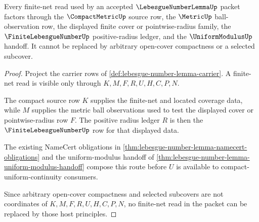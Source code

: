 \begin{theorem}
\label{thm:lebesgue-number-lemma-finite-net-route}
Every finite-net read used by an accepted $\LebesgueNumberLemmaUp$ packet factors through the $\CompactMetricUp$ source row, the $\MetricUp$ ball-observation row, the displayed finite cover or pointwise-radius family, the $\FiniteLebesgueNumberUp$ positive-radius ledger, and the $\UniformModulusUp$ handoff. It cannot be replaced by arbitrary open-cover compactness or a selected subcover.
\end{theorem}
\begin{proof}
Project the carrier rows of \autoref{def:lebesgue-number-lemma-carrier}. A finite-net read is visible only through $K,M,F,R,U,H,C,P,N$.

The compact source row $K$ supplies the finite-net and located coverage data, while $M$ supplies the metric ball observations used to test the displayed cover or pointwise-radius row $F$. The positive radius ledger $R$ is then the $\FiniteLebesgueNumberUp$ row for that displayed data.

The existing NameCert obligations in \autoref{thm:lebesgue-number-lemma-namecert-obligations} and the uniform-modulus handoff of \autoref{thm:lebesgue-number-lemma-uniform-modulus-handoff} compose this route before $U$ is available to compact-uniform-continuity consumers.

Since arbitrary open-cover compactness and selected subcovers are not coordinates of $K,M,F,R,U,H,C,P,N$, no finite-net read in the packet can be replaced by those host principles.
\end{proof}

